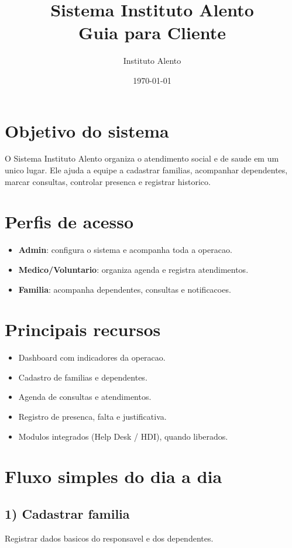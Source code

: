 \documentclass[12pt,a4paper]{article}
\title{Sistema Instituto Alento \\ Guia para Cliente}
\author{Instituto Alento}
\date{\today}
\begin{document}
\maketitle
\tableofcontents
\newpage

\section{Objetivo do sistema}
O Sistema Instituto Alento organiza o atendimento social e de saude em um unico lugar.
Ele ajuda a equipe a cadastrar familias, acompanhar dependentes, marcar consultas, controlar presenca e registrar historico.

\section{Perfis de acesso}
\begin{itemize}[leftmargin=*]
\item \textbf{Admin}: configura o sistema e acompanha toda a operacao.
\item \textbf{Medico/Voluntario}: organiza agenda e registra atendimentos.
\item \textbf{Familia}: acompanha dependentes, consultas e notificacoes.
\end{itemize}

\section{Principais recursos}
\begin{itemize}[leftmargin=*]
\item Dashboard com indicadores da operacao.
\item Cadastro de familias e dependentes.
\item Agenda de consultas e atendimentos.
\item Registro de presenca, falta e justificativa.
\item Modulos integrados (Help Desk / HDI), quando liberados.
\end{itemize}

\section{Fluxo simples do dia a dia}
\subsection{1) Cadastrar familia}
Registrar dados basicos do responsavel e dos dependentes.
\end{document}
